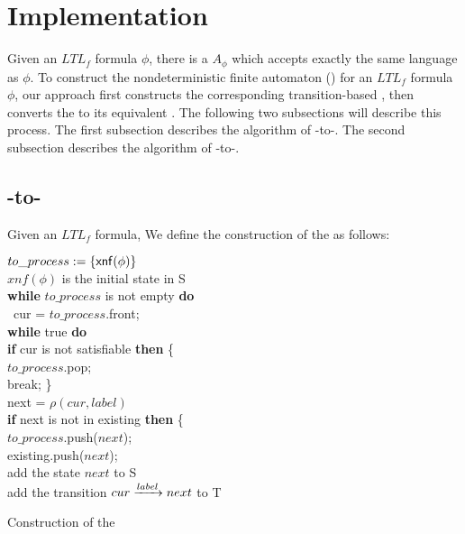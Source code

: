 \section{Implementation}\label{sec:algorithm}
Given an $LTL_f$ formula $\phi$, there is a \NFA $A_{\phi}$ which accepts exactly the same language as $\phi$. To construct the nondeterministic finite automaton (\NFA) for an $ LTL_f$ formula $\phi$, our approach first constructs the corresponding transition-based \NFA, then converts the \TNFA to its equivalent \NFA. The following two subsections will describe this process. The first subsection describes the algorithm of \ltlf-to-\TNFA. The second subsection describes the algorithm of \TNFA-to-\NFA.

\subsection{\ltlf-to-\TNFA}
Given an  $ LTL_f$ formula, We define the construction of the \TNFA  as follows: \\
  \begin{algorithm}[H]
    \SetAlgoNoLine
    \BlankLine
 $to\_process:= \{{\sf xnf}(\phi)\}$\\
 $xnf(\phi)$ is the initial state in S\\
\textbf{while} $to\_process$ is not empty \textbf{do} \\
\ cur =  $to\_process$.front;  \\
\quad  \textbf{while} true \textbf{do} \\
\qquad   \textbf{if} cur is not satisfiable  \textbf{then} \{ \\
\qquad \quad $to\_process$.pop; \\
\qquad \quad break;     \}\\
 \qquad  next = $\rho(cur, label)$ \\
\qquad\textbf{if} next is not in existing \textbf{then} \{ \\
\qquad \quad $to\_process$.push($next$); \\
\qquad \quad existing.push($next$); \\
\qquad  \quad add the state $next$ to S\\
\qquad  add the transition $cur\xrightarrow[]{label}next$ to T
 \caption{Construction of the \TNFA}
\end{algorithm}

